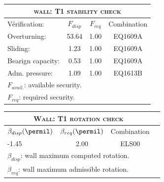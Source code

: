\begin{center}
\begin{tabular}[H]{|l|c|c|c|}
\hline
\multicolumn{4}{|c|}{\textsc{wall: T1 stability check}}\\
\hline
Vérification:  & $F_{disp}$ & $F_{req}$ & Combination\\
\hline
Overturning:  & 53.64 & 1.00 & EQ1609A\\
Sliding:  & 1.23 & 1.00 & EQ1609A\\
Bearign capacity:  & 0.53 & 1.00 & EQ1609A\\
Adm. pressure:  & 1.09 & 1.00 & EQ1613B\\
\hline
\multicolumn{4}{|l|}{$F_{avail.}$: available security.}\\
\multicolumn{4}{|l|}{$F_{req}$: required security.}\\
\hline
\end{tabular}
\end{center}
\begin{center}
\begin{tabular}[H]{|l|c|c|c|}
\hline
\multicolumn{3}{|c|}{\textsc{Wall: T1 rotation check}}\\
\hline
$\beta_{disp} (\permil)$ & $\beta_{req}(\permil)$ & Combination\\
\hline
-1.45 & 2.00 & ELS00\\
\hline
\multicolumn{3}{|l|}{$\beta_{disp}$: wall maximum computed rotation.}\\
\multicolumn{3}{|l|}{$\beta_{req}$: wall maximum admissible rotation.}\\
\hline
\end{tabular}
\end{center}
 \label{tb_T1}
\tablelasttail{\hline}
